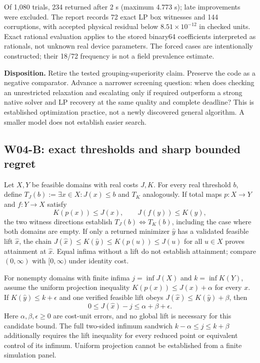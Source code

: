 \documentclass[11pt,letterpaper]{article}
\begin{document}
Of 1,080 trials, 234 returned after 2 s (maximum 4.773 s); late improvements were excluded. The report records 72 exact LP box witnesses and 144 corruptions, with accepted physical residual below $8.51\times10^{-12}$ in checked units. Exact rational evaluation applies to the stored binary64 coefficients interpreted as rationals, not unknown real device parameters. The forced cases are intentionally constructed; their 18/72 frequency is not a field prevalence estimate.

\textbf{Disposition.} Retire the tested grouping-superiority claim. Preserve the code as a negative comparator. Advance a narrower screening question: when does checking an unrestricted relaxation and escalating only if required outperform a strong native solver and LP recovery at the same quality and complete deadline? This is established optimization practice, not a newly discovered general algorithm. A smaller model does not establish easier search.

\subsection{W04-B: exact thresholds and sharp bounded regret}
\label{sec:w04math}
Let $X,Y$ be feasible domains with real costs $J,K$. For every real threshold $b$, define $T_J(b):=\exists x\in X:J(x)\le b$ and $T_K$ analogously. If total maps $p:X\to Y$ and $f:Y\to X$ satisfy
\[
 K(p(x))\le J(x),\qquad J(f(y))\le K(y),
\]
the two witness directions establish $T_J(b)\iff T_K(b)$, including the case where both domains are empty. If only a returned minimizer $\hat y$ has a validated feasible lift $\hat x$, the chain $J(\hat x)\le K(\hat y)\le K(p(u))\le J(u)$ for all $u\in X$ proves attainment at $\hat x$. Equal infima without a lift do not establish attainment; compare $(0,\infty)$ with $[0,\infty)$ under identity cost.

For nonempty domains with finite infima $j=\inf J(X)$ and $k=\inf K(Y)$, assume the uniform projection inequality $K(p(x))\le J(x)+\alpha$ for every $x$. If $K(\hat y)\le k+\epsilon$ and one verified feasible lift obeys $J(\hat x)\le K(\hat y)+\beta$, then
\begin{equation}
 0\le J(\hat x)-j\le\alpha+\beta+\epsilon .
 \label{eq:w04sharp}
\end{equation}
Here $\alpha,\beta,\epsilon\ge0$ are cost-unit errors, and no global lift is necessary for this candidate bound. The full two-sided infimum sandwich $k-\alpha\le j\le k+\beta$ additionally requires the lift inequality for every reduced point or equivalent control of its infimum. Uniform projection cannot be established from a finite simulation panel.
\end{document}
